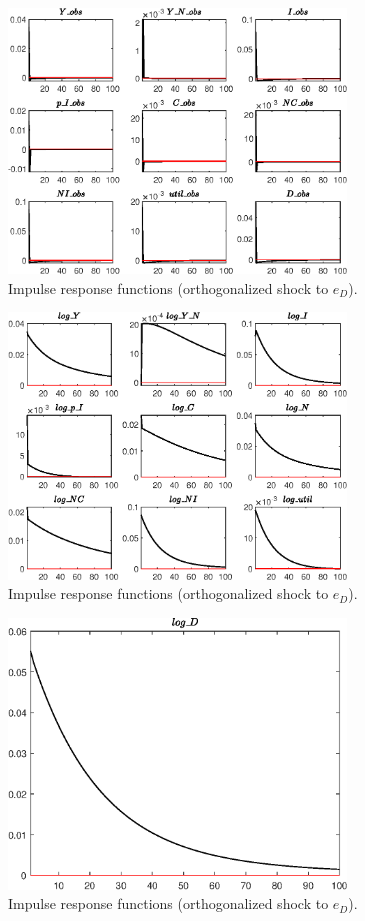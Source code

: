 \begin{figure}[H]
\centering 
\includegraphics[width=0.80\textwidth]{BRS_growth_util/graphs/BRS_growth_util_IRF_e_D1}
\caption{Impulse response functions (orthogonalized shock to ${e_D}$).}\label{Fig:IRF:e_D:1}
\end{figure}
 
\begin{figure}[H]
\centering 
\includegraphics[width=0.80\textwidth]{BRS_growth_util/graphs/BRS_growth_util_IRF_e_D2}
\caption{Impulse response functions (orthogonalized shock to ${e_D}$).}\label{Fig:IRF:e_D:2}
\end{figure}
 
\begin{figure}[H]
\centering 
\includegraphics[width=0.80\textwidth]{BRS_growth_util/graphs/BRS_growth_util_IRF_e_D3}
\caption{Impulse response functions (orthogonalized shock to ${e_D}$).}\label{Fig:IRF:e_D:3}
\end{figure}
 
 

